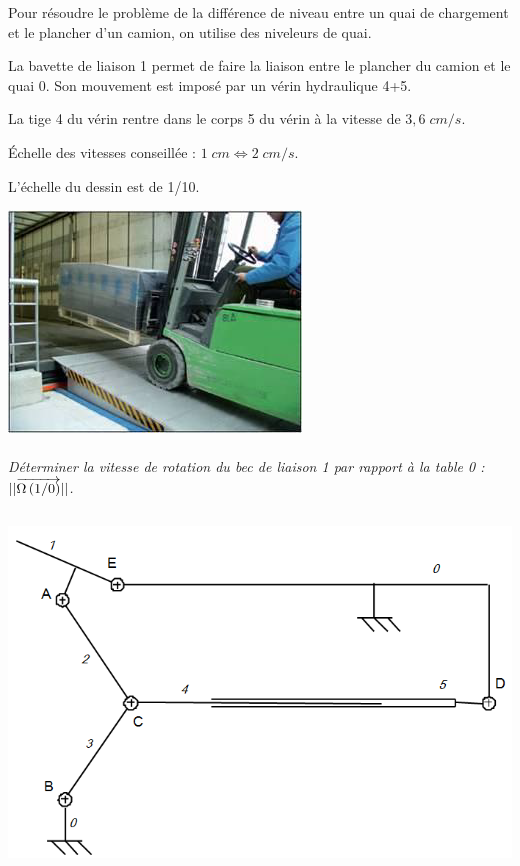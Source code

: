 \documentclass[11pt,oneside]{article}
\begin{document}
\begin{minipage}[c]{.45\linewidth}
Pour résoudre le problème de la différence de niveau entre un quai 
de chargement et le plancher d'un camion, on utilise des niveleurs de 
quai.

La bavette de liaison 1 permet de faire la liaison entre le plancher du 
camion  et le quai 0. Son mouvement est imposé par un vérin 
hydraulique 4+5.

La tige  4  du vérin rentre dans le corps 5 du vérin  à la vitesse de 
$3,6\;cm/s$.

Échelle des vitesses conseillée : $1\;cm \Longleftrightarrow 2\;cm/s$.

L’échelle du dessin est de 1/10.

\end{minipage}\hfill
\begin{minipage}[c]{.45\linewidth}

\begin{center}
\includegraphics[width=.8\textwidth]{png/fig1}
\end{center}
\end{minipage}
\paragraph{}
\textit{Déterminer la vitesse de rotation du bec de liaison 1 par rapport à la table 0 : $||\overrightarrow{\Omega\left( {1}/{0}\right)}||$.}

\newpage
$$
\quad
$$
\vspace{5cm}

\begin{center}
\includegraphics[width=.8\textwidth]{png/fig2}
\end{center}
\end{document}
